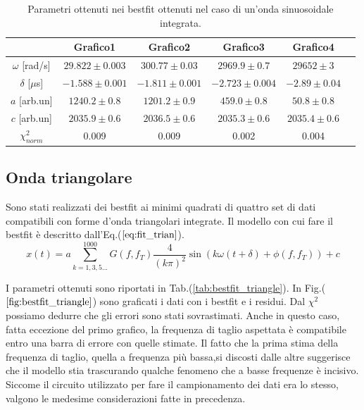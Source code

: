 \documentclass{article}
\begin{document}
            \begin{table}[H]
                \centering
                \begin{tabular}{cccccc}
                    \hline
                               & Grafico1              &Grafico2               & Grafico3                &Grafico4 \\
                    \hline
                    $\omega$ [rad/s]    & $29.822\pm 0.003$     & $300.77 \pm 0.03$     & $2969.9\pm 0.7$         & $29652  \pm 3$ \\
                    $\delta$ [$\mu$s]   & $-1.588 \pm 0.001$    & $-1.811 \pm 0.001$    & $-2.723\pm 0.004$       & $-2.89 \pm 0.04$ \\
                    $a$ [arb.un]          & $1240.2\pm 0.8$       & $1201.2\pm 0.9$        & $459.0 \pm 0.8$         & $50.8 \pm 0.8$ \\
                    $c$ [arb.un]          & $2035.9 \pm 0.6$      & $2036.5 \pm 0.6$      & $2035.3 \pm 0.6$        & $2035.4 \pm 0.6$ \\
                    $\chi^{2}_{norm}$   & 0.009                 & 0.009                 & 0.002                   & 0.004 \\
                    \hline
                \end{tabular}
                \caption{Parametri ottenuti nei bestfit ottenuti nel caso di un'onda sinuosoidale integrata.}
                \label{tab:bestfit_sinusoid}
            \end{table}

    \subsection{Onda triangolare}
        \label{sez:bestfit_trian}
        Sono stati realizzati dei bestfit ai minimi quadrati
        di quattro set di dati compatibili con forme d'onda triangolari integrate.
         Il modello con cui fare il bestfit è descritto dall'Eq.($\ref{eq:fit_trian}$).
            \begin{equation}
                x(t) = a\sum_{k=1,3,5...}^{1000} G(f,f_T)\frac{4}{(k\pi)^2}\sin\left(k\omega (t+\delta)+\phi(f,f_T)\right) +c
                \label{eq:fit_trian}
            \end{equation} 

        \noindent I parametri ottenuti sono riportati in Tab.(\ref{tab:bestfit_triangle}).%
        In Fig.($\ref{fig:bestfit_triangle}$) sono graficati i dati con i bestfit e 
        i residui. Dal $\chi^2$ possiamo dedurre che gli errori sono stati sovrastimati.
        Anche in questo caso, fatta eccezione del primo grafico, la frequenza di taglio aspettata 
        è compatibile entro una  barra di errore con quelle stimate. Il fatto che la prima stima  della
        frequenza  di taglio, quella a frequenza più bassa,si discosti dalle altre suggerisce
        che il modello stia trascurando qualche fenomeno che a basse frequenze è incisivo.
        Siccome il circuito utilizzato per fare il campionamento dei dati era lo stesso, valgono le medesime considerazioni fatte in precedenza.
       
\end{document}
